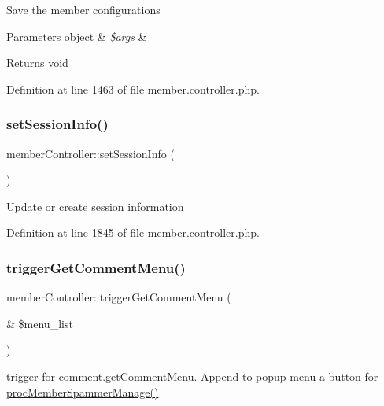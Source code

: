 Save the member configurations


\begin{DoxyParams}[1]{Parameters}
object & {\em \$args} & \\
\hline
\end{DoxyParams}
\begin{DoxyReturn}{Returns}
void 
\end{DoxyReturn}


Definition at line 1463 of file member.\+controller.\+php.

\mbox{\label{classmemberController_ae4175b4a60e0b3000ed12e36508720ad}} 
\subsubsection{\texorpdfstring{set\+Session\+Info()}{setSessionInfo()}}
{\footnotesize\ttfamily member\+Controller\+::set\+Session\+Info (\begin{DoxyParamCaption}{ }\end{DoxyParamCaption})}

Update or create session information 

Definition at line 1845 of file member.\+controller.\+php.

\mbox{\label{classmemberController_aa97406ab4da679f7b54cceb404bd563f}} 
\subsubsection{\texorpdfstring{trigger\+Get\+Comment\+Menu()}{triggerGetCommentMenu()}}
{\footnotesize\ttfamily member\+Controller\+::trigger\+Get\+Comment\+Menu (\begin{DoxyParamCaption}\item[{\&}]{\$menu\+\_\+list }\end{DoxyParamCaption})}

trigger for comment.\+get\+Comment\+Menu. Append to popup menu a button for \hyperlink{classmemberController_a99f87aecac7ae283cec747a007df88b8}{proc\+Member\+Spammer\+Manage()}


